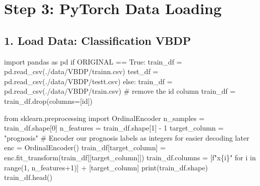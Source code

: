 \documentclass[
  letterpaper,
  DIV=11,
  numbers=noendperiod]{scrreprt}
\newenvironment{Shaded}{\begin{snugshade}}{\end{snugshade}}
\newcommand{\BuiltInTok}[1]{\textcolor[rgb]{0.00,0.23,0.31}{#1}}
\newcommand{\CommentTok}[1]{\textcolor[rgb]{0.37,0.37,0.37}{#1}}
\newcommand{\ControlFlowTok}[1]{\textcolor[rgb]{0.00,0.23,0.31}{#1}}
\newcommand{\DecValTok}[1]{\textcolor[rgb]{0.68,0.00,0.00}{#1}}
\newcommand{\ImportTok}[1]{\textcolor[rgb]{0.00,0.46,0.62}{#1}}
\newcommand{\KeywordTok}[1]{\textcolor[rgb]{0.00,0.23,0.31}{#1}}
\newcommand{\NormalTok}[1]{\textcolor[rgb]{0.00,0.23,0.31}{#1}}
\newcommand{\OperatorTok}[1]{\textcolor[rgb]{0.37,0.37,0.37}{#1}}
\newcommand{\SpecialCharTok}[1]{\textcolor[rgb]{0.37,0.37,0.37}{#1}}
\newcommand{\SpecialStringTok}[1]{\textcolor[rgb]{0.13,0.47,0.30}{#1}}
\newcommand{\StringTok}[1]{\textcolor[rgb]{0.13,0.47,0.30}{#1}}
\newcommand{\VariableTok}[1]{\textcolor[rgb]{0.07,0.07,0.07}{#1}}
\begin{document}
\hypertarget{step-3-pytorch-data-loading-1}{%
\section{Step 3: PyTorch Data
Loading}\label{step-3-pytorch-data-loading-1}}

\hypertarget{load-data-classification-vbdp-2}{%
\subsection{1. Load Data: Classification
VBDP}\label{load-data-classification-vbdp-2}}

\begin{Shaded}
\begin{Highlighting}[]
\ImportTok{import}\NormalTok{ pandas }\ImportTok{as}\NormalTok{ pd}
\ControlFlowTok{if}\NormalTok{ ORIGINAL }\OperatorTok{==} \VariableTok{True}\NormalTok{:}
\NormalTok{    train\_df }\OperatorTok{=}\NormalTok{ pd.read\_csv(}\StringTok{\textquotesingle{}./data/VBDP/trainn.csv\textquotesingle{}}\NormalTok{)}
\NormalTok{    test\_df }\OperatorTok{=}\NormalTok{ pd.read\_csv(}\StringTok{\textquotesingle{}./data/VBDP/testt.csv\textquotesingle{}}\NormalTok{)}
\ControlFlowTok{else}\NormalTok{:}
\NormalTok{    train\_df }\OperatorTok{=}\NormalTok{ pd.read\_csv(}\StringTok{\textquotesingle{}./data/VBDP/train.csv\textquotesingle{}}\NormalTok{)}
    \CommentTok{\# remove the id column}
\NormalTok{    train\_df }\OperatorTok{=}\NormalTok{ train\_df.drop(columns}\OperatorTok{=}\NormalTok{[}\StringTok{\textquotesingle{}id\textquotesingle{}}\NormalTok{])}
\end{Highlighting}
\end{Shaded}

\begin{Shaded}
\begin{Highlighting}[]
\ImportTok{from}\NormalTok{ sklearn.preprocessing }\ImportTok{import}\NormalTok{ OrdinalEncoder}
\NormalTok{n\_samples }\OperatorTok{=}\NormalTok{ train\_df.shape[}\DecValTok{0}\NormalTok{]}
\NormalTok{n\_features }\OperatorTok{=}\NormalTok{ train\_df.shape[}\DecValTok{1}\NormalTok{] }\OperatorTok{{-}} \DecValTok{1}
\NormalTok{target\_column }\OperatorTok{=} \StringTok{"prognosis"}
\CommentTok{\# Encoder our prognosis labels as integers for easier decoding later}
\NormalTok{enc }\OperatorTok{=}\NormalTok{ OrdinalEncoder()}
\NormalTok{train\_df[target\_column] }\OperatorTok{=}\NormalTok{ enc.fit\_transform(train\_df[[target\_column]])}
\NormalTok{train\_df.columns }\OperatorTok{=}\NormalTok{ [}\SpecialStringTok{f"x}\SpecialCharTok{\{}\NormalTok{i}\SpecialCharTok{\}}\SpecialStringTok{"} \ControlFlowTok{for}\NormalTok{ i }\KeywordTok{in} \BuiltInTok{range}\NormalTok{(}\DecValTok{1}\NormalTok{, n\_features}\OperatorTok{+}\DecValTok{1}\NormalTok{)] }\OperatorTok{+}\NormalTok{ [target\_column]}
\BuiltInTok{print}\NormalTok{(train\_df.shape)}
\NormalTok{train\_df.head()}
\end{Highlighting}
\end{Shaded}
\end{document}

